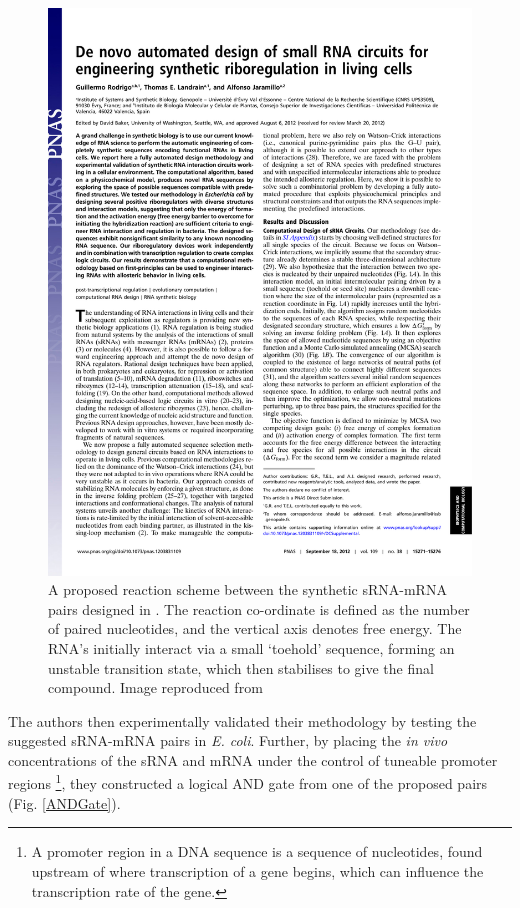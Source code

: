 \documentclass[10pt,journal]{./IEEE_latex_class/IEEEtran}
\begin{document}
\begin{figure}[h]
\centering
\includegraphics[trim = 60 630 300 30,page=2,clip = true]{pnas1203831109.pdf}
\caption{A proposed reaction scheme between the synthetic sRNA-mRNA pairs designed in \cite{Rodrigo2012}. The reaction co-ordinate is defined as the number of paired nucleotides, and the vertical axis denotes free energy. The RNA's initially interact via a small 
`toehold' sequence, forming an unstable transition state, which then stabilises to give the final compound. Image reproduced from \cite{Rodrigo2012}}
\label{reactionscheme}
\end{figure}


The authors then experimentally validated their methodology by testing the suggested sRNA-mRNA pairs in \textit{E. coli}.  Further, by placing the \textit{in vivo}  concentrations of the sRNA and mRNA under the control of tuneable promoter regions \footnote{A promoter region in a DNA sequence is a sequence of nucleotides, found upstream of where transcription of a gene begins, which can influence the transcription rate of the gene.}, they constructed a logical AND gate from one of the proposed pairs (Fig. \ref{ANDGate}). 
\end{document}
